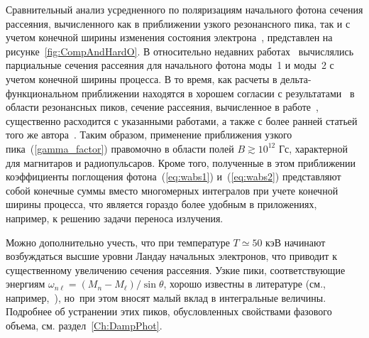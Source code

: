 Сравнительный анализ усредненного по поляризациям начального фотона сечения 
рассеяния, вычисленного как в приближении узкого 
резонансного пика, так 
и с 
учетом 
конечной ширины изменения состояния 
электрона~\cite{Harding:1991,SchwarmD:2017}, представлен на 
рисунке~\ref{fig:CompAndHardO}.  
В относительно недавних работах~\cite{Mushtukov:2016,SchwarmD:2017} 
вычислялись 
парциальные сечения рассеяния для начального фотона моды~1 и моды~2 с учетом 
конечной ширины процесса. В то время, как расчеты в дельта-функциональном 
приближении находятся в хорошем согласии с 
результатами~\cite{Harding:1991,SchwarmD:2017} в области резонансных пиков, 
сечение рассеяния, вычисленное в работе~\cite{Mushtukov:2016}, существенно 
расходится с 
указанными работами, а также с более ранней статьей того же 
автора~\cite{Mushtukov:2015}. 
Таким образом, применение 
приближения узкого пика~(\ref{gamma_factor}) правомочно  в области полей $B 
\gtrsim 
10^{12}$ Гс, характерной для магнитаров и радиопульсаров. Кроме того, 
полученные в этом приближении коэффициенты поглощения фотона~(\ref{eq:wabs1}) 
и~(\ref{eq:wabs2}) 
представляют собой конечные суммы вместо многомерных интегралов при учете 
конечной ширины процесса, что 
является гораздо более 
удобным в приложениях, например, к решению задачи переноса излучения.

Можно дополнительно учесть, что при температуре $T\simeq 50$ кэВ начинают 
возбуждаться высшие уровни Ландау начальных электронов, что приводит к 
существенному 
увеличению  сечения рассеяния. Узкие пики, соответствующие 
энергиям $\omega_{n\ell}=(M_n-M_\ell)/\sin \theta$, хорошо известны в 
литературе (см., 
например,~\cite{Pavlov:1991,Klepikov:1954,Baier:2007}), но~при этом вносят 
малый вклад в 
интегральные 
величины. Подробнее об устранении этих пиков, обусловленных свойствами фазового 
объема, см. раздел~\ref{Ch:DampPhot}.

